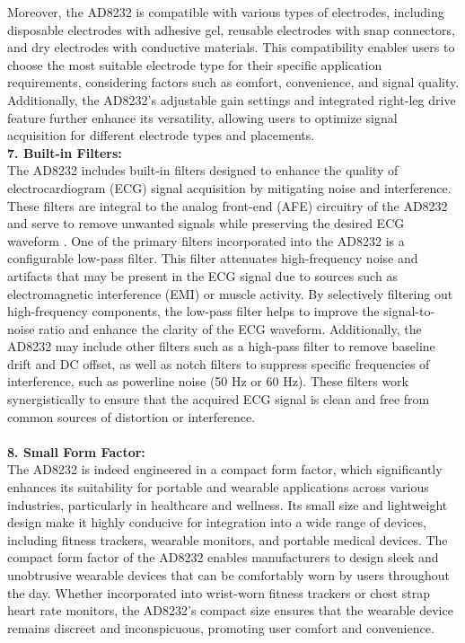 Moreover, the AD8232 is compatible with various types of electrodes, including disposable electrodes with adhesive gel, reusable electrodes with snap connectors, and dry electrodes with conductive materials. This compatibility enables users to choose the most suitable electrode type for their specific application requirements, considering factors such as comfort, convenience, and signal quality. Additionally, the AD8232's adjustable gain settings and integrated right-leg drive feature further enhance its versatility, allowing users to optimize signal acquisition for different electrode types and placements.
\\
\textbf{7. Built-in Filters:}
\\
The AD8232 includes built-in filters designed to enhance the quality of electrocardiogram (ECG) signal acquisition by mitigating noise and interference. These filters are integral to the analog front-end (AFE) circuitry of the AD8232 and serve to remove unwanted signals while preserving the desired ECG waveform \cite{pons2021evanescent}.
One of the primary filters incorporated into the AD8232 is a configurable low-pass filter. This filter attenuates high-frequency noise and artifacts that may be present in the ECG signal due to sources such as electromagnetic interference (EMI) or muscle activity. By selectively filtering out high-frequency components, the low-pass filter helps to improve the signal-to-noise ratio and enhance the clarity of the ECG waveform.
Additionally, the AD8232 may include other filters such as a high-pass filter to remove baseline drift and DC offset, as well as notch filters to suppress specific frequencies of interference, such as powerline noise (50 Hz or 60 Hz). These filters work synergistically to ensure that the acquired ECG signal is clean and free from common sources of distortion or interference.
\\
\\
\textbf{8. Small Form Factor:}
\\
The AD8232 is indeed engineered in a compact form factor, which significantly enhances its suitability for portable and wearable applications across various industries, particularly in healthcare and wellness. Its small size and lightweight design make it highly conducive for integration into a wide range of devices, including fitness trackers, wearable monitors, and portable medical devices.
The compact form factor of the AD8232 enables manufacturers to design sleek and unobtrusive wearable devices that can be comfortably worn by users throughout the day. Whether incorporated into wrist-worn fitness trackers or chest strap heart rate monitors, the AD8232's compact size ensures that the wearable device remains discreet and inconspicuous, promoting user comfort and convenience.
